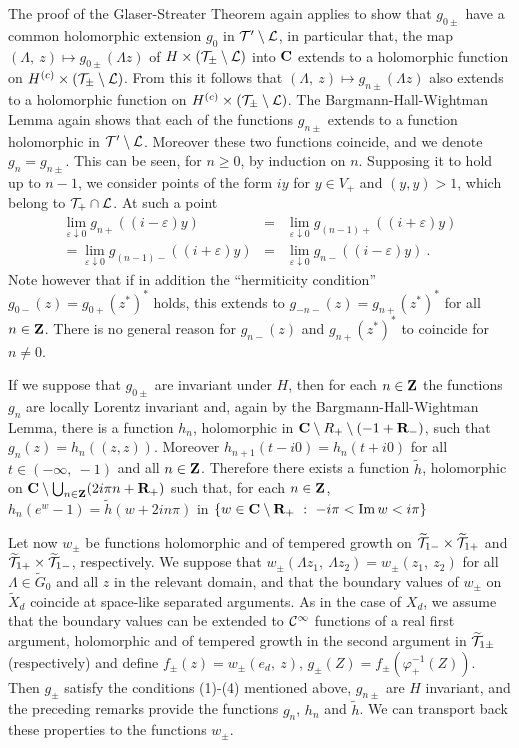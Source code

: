 \documentclass[a4paper,a4paper]{article}
\def\bC{{\bf C}}
\def\bR{{\bf R}}
\def\bZ{{\bf Z}}
\def\Im{{\rm Im\,}}
\def\CC{{\cal C}}
\def\LL{{\cal L}}
\def\TT{{\cal T}}
\def\wt{\widetilde}
\def \vhi{\varphi}
\def \veps{\varepsilon}
\def\wXd{{\wt X_d}}
\begin{document}
The proof of the Glaser-Streater Theorem again applies to
show that $g_{0\pm}$ have a common holomorphic extension
$g_0$ in $\TT' \setminus \LL$, in particular that,
the map $(\Lambda,\ z) \mapsto g_{0\pm}(\Lambda z)$ of
$H\times (\TT_\pm \setminus \LL)$ into $\bC$ extends to a holomorphic
function on $H^{(c)}\times (\TT_\pm \setminus \LL)$. From this it follows
that $(\Lambda,\ z) \mapsto g_{n\pm}(\Lambda z)$ also
extends to a holomorphic function on $H^{(c)}\times (\TT_\pm \setminus \LL)$.
The Bargmann-Hall-Wightman Lemma again shows that each of the
functions $g_{n\pm}$ extends to a function holomorphic in
$\TT' \setminus \LL$. Moreover these two functions coincide, and we
denote $g_n = g_{n\pm}$. This can be seen, for $n \ge 0$,
by induction on $n$. Supposing it to hold up to $n-1$,
we consider points of the form $iy$ for $y \in V_+$ and
$(y,y) > 1$, which belong to $\TT_+\cap \LL$. At such a point
\begin{eqnarray}
\lim_{\veps \downarrow 0} g_{n+}((i-\veps)y) &=&
\lim_{\veps \downarrow 0} g_{(n-1)+}((i+\veps)y)
\nonumber \\
= \lim_{\veps \downarrow 0} g_{(n-1)-}((i+\veps)y) &=&
\lim_{\veps \downarrow 0} g_{n-}((i-\veps)y)\ .
\label{w2pt.6}\end{eqnarray}
Note however that if in addition the ``hermiticity
condition'' $g_{0-}(z) = g_{0+}(z^*)^*$ holds, this extends to
$g_{-n-}(z) = g_{n+}(z^*)^*$ for all $n \in \bZ$.
There is no general reason for
$g_{n-}(z)$ and $g_{n+}(z^*)^*$ to coincide for
$n \not= 0$.

If we suppose that $g_{0\pm}$ are invariant under $H$, then
for each $n \in \bZ$ the functions $g_n$ are locally Lorentz invariant
and, again by the Bargmann-Hall-Wightman Lemma, there is a
function $h_n$, holomorphic in
$\bC \setminus  R_+  \setminus  (-1+\bR_-)$,
such that $g_n(z) = h_n((z,z))$. Moreover
$h_{n+1}(t-i0) = h_n(t+i0)$ for all $t \in (-\infty,\ -1)$
and all $n \in \bZ$. Therefore there exists a function
$\wt h$, holomorphic on
$\bC \setminus \bigcup_{n \in \bZ} (2i\pi n + \bR_+)$
such that, for each $n \in \bZ$, $h_n(e^w -1) = \wt h(w+2in\pi)$
in $\{w\in \bC\setminus \bR_+\ :\ -i\pi < \Im w < i\pi\}$

Let now $w_\pm$ be functions holomorphic and of tempered
growth on $\wt \TT_{1-}\times\wt \TT_{1+}$ and
$\wt \TT_{1+}\times\wt \TT_{1-}$, respectively.
We suppose that
$w_\pm(\Lambda z_1,\ \Lambda z_2) = w_\pm(z_1,\ z_2)$
for all $\Lambda \in \wt G_0$ and all $z$ in the relevant
domain, and that the boundary values of $w_\pm$ on $\wXd$
coincide at space-like separated arguments.
As in the case
of $X_d$, we assume that the boundary values can be extended
to $\CC^\infty$ functions of a real first argument, holomorphic
and of tempered growth in the second argument in
$\wt \TT_{1\pm}$ (respectively) and define
$f_\pm(z) = w_\pm(e_d,\ z)$, $g_\pm(Z) = f_\pm(\vhi_+^{-1}(Z))$.
Then $g_\pm$ satisfy the conditions (1)-(4) mentioned above,
$g_{n\pm}$ are $H$ invariant, and the preceding remarks
provide the functions $g_n$, $h_n$ and $\wt h$.
We can transport back these properties to the functions $w_\pm$.
\end{document}
